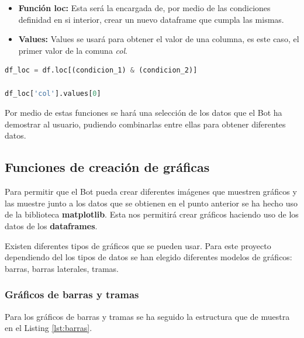 \begin{itemize}
	\item \textbf{Función loc:} Esta será la encargada de, por medio de las condiciones definidad en si interior, crear un nuevo dataframe que cumpla las mismas.
	\item \textbf{Values:} Values se usará para obtener el valor de una columna, es este caso, el primer valor de la comuna \textit{col}.
\end{itemize}

\begin{lstlisting}[language=Python, caption={Función loc.}, label={lst:funcion-2}]
df_loc = df.loc[(condicion_1) & (condicion_2)]

df_loc['col'].values[0]
\end{lstlisting}

Por medio de estas funciones se hará una selección de los datos que el Bot ha demostrar al usuario, pudiendo combinarlas entre ellas para obtener diferentes datos.

\subsection{Funciones de creación de gráficas}

Para permitir que el Bot pueda crear diferentes imágenes que muestren gráficos y las muestre junto a los datos que se obtienen en el punto anterior se ha hecho uso de la biblioteca \textbf{matplotlib}. Esta nos permitirá crear gráficos haciendo uso de los datos de los \textbf{dataframes}.

Existen diferentes tipos de gráficos que se pueden usar. Para este proyecto dependiendo del los tipos de datos se han elegido diferentes modelos de gráficos: barras, barras laterales, tramas.

\subsubsection{Gráficos de barras y tramas}

Para los gráficos de barras y tramas se ha seguido la estructura que de muestra en el Listing \ref{lst:barras}. 

